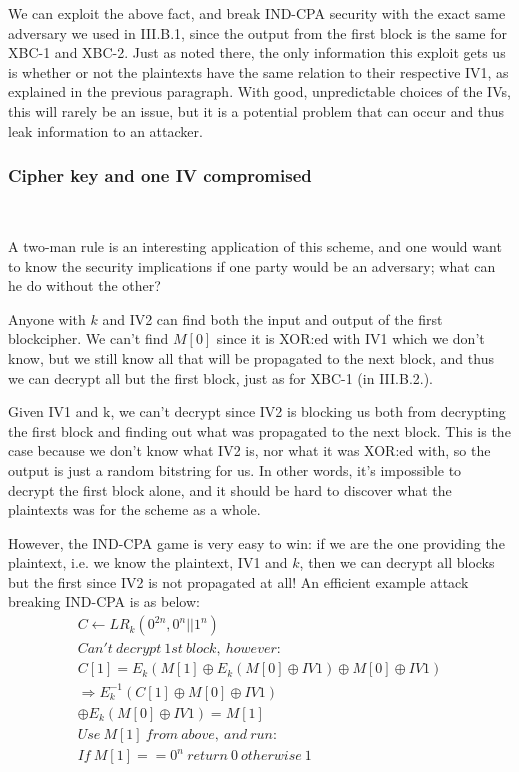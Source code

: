 \documentclass[conference]{IEEEtran}
\begin{document}
We can exploit the above fact, and break IND-CPA security with the exact same adversary we used in III.B.1, since the output from the first block is the same for XBC-1 and XBC-2. Just as noted there, the only information this exploit gets us is whether or not the plaintexts have the same relation to their respective IV1, as explained in the previous paragraph. With good, unpredictable choices of the IVs, this will rarely be an issue, but it is a potential problem that can occur and thus leak information to an attacker.

\subsubsection{Cipher key and one IV compromised} \

A two-man rule is an interesting application of this scheme, and one would want to know the security implications if one party would be an adversary; what can he do without the other? \

Anyone with $k$ and IV2 can find both the input and output of the first blockcipher. We can't find $M[0]$ since it is XOR:ed with IV1 which we don't know, but we still know all that will be propagated to the next block, and thus we can decrypt all but the first block, just as for XBC-1 (in III.B.2.). \

Given IV1 and k, we can't decrypt since IV2 is blocking us both from decrypting the first block and finding out what was propagated to the next block. This is the case because we don't know what IV2 is, nor what it was XOR:ed with, so the output is just a random bitstring for us. In other words, it's impossible to decrypt the first block alone, and it should be hard to discover what the plaintexts was for the scheme as a whole. \

However, the IND-CPA game is very easy to win: if we are the one providing the plaintext, i.e. we know the plaintext, IV1 and $k$, then we can decrypt all blocks but the first since IV2 is not propagated at all! An efficient example attack breaking IND-CPA is as below:
\begin{gather*}
  C \leftarrow LR_k(0^{2n},0^n || 1^n) \\
  Can't\ decrypt\ 1st\ block,\ however: \\
  C[1] = E_k(M[1] \oplus E_k(M[0] \oplus IV1) \oplus M[0] \oplus IV1) \\
  \Rightarrow E_k^{-1}(C[1] \oplus M[0] \oplus IV1) \\
  \oplus E_k(M[0] \oplus IV1) = M[1] \\
  Use\ M[1]\ from\ above,\ and\ run: \\
  If\ M[1]==0^n\ return\ 0\ otherwise\ 1
\end{gather*}
\end{document}
